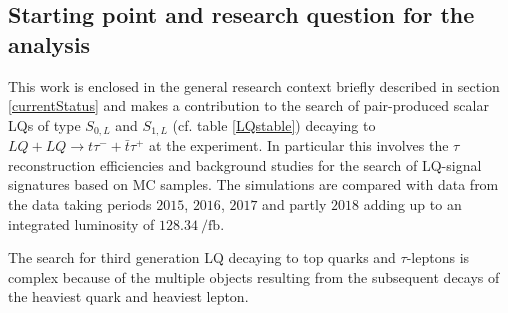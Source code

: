 \subsection{Starting point and research question for the analysis}\label{startingpoint}
This work is enclosed in the general research context briefly described in section \ref{currentStatus} and makes a contribution to the search of pair-produced scalar LQs of type $S_{0,L}$ and $S_{1,L}$ (cf. table \ref{LQstable}) decaying to $LQ+LQ\rightarrow t\tau^{-}+\bar{t}\tau^{+}$ at the {\ATLAS} experiment. In particular this involves the $\tau$ reconstruction efficiencies and background studies for the search of LQ-signal signatures based on MC samples. The simulations are compared with data from the data taking periods $2015$, $2016$, $2017$ and partly $2018$ adding up to an integrated luminosity of $\SI{128.34}{\per\femto\barn}$.\par   
The search for third generation LQ decaying to top quarks and $\tau$-leptons is complex because of the multiple objects resulting from the subsequent decays of the heaviest quark and heaviest lepton. 
%
